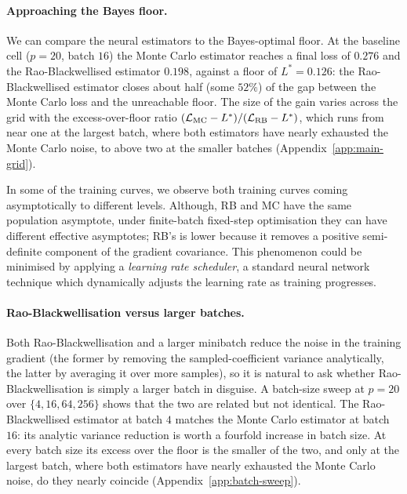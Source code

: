 \paragraph{Approaching the Bayes floor.}
\label{sec:lr-asymptotic}
We can compare the neural estimators to the Bayes-optimal floor. At the
baseline cell ($p = 20$, batch $16$) the Monte Carlo estimator reaches
a final loss of $0.276$ and the Rao-Blackwellised estimator $0.198$,
against a floor of $L^{*} = 0.126$: the Rao-Blackwellised estimator
closes about half (some $52\%$) of the gap between the Monte Carlo
loss and the unreachable floor. The size of the gain varies across the
grid with the excess-over-floor ratio
$(\mathcal{L}_{\mathrm{MC}} - L^{*})/(\mathcal{L}_{\mathrm{RB}} - L^{*})$, which runs
from near one at the largest batch, where both estimators have nearly
exhausted the Monte Carlo noise, to above two at the smaller batches
(Appendix~\ref{app:main-grid}).

In some of the training curves, we observe both training curves coming asymptotically to different levels. Although, RB and MC have the same population asymptote, under finite-batch fixed-step optimisation they can have different effective asymptotes; RB's is lower because it removes a positive semi-definite component of the gradient covariance. This phenomenon could be minimised by applying a \emph{learning rate scheduler}, a standard neural network technique which dynamically adjusts the learning rate as training progresses.

\paragraph{Rao-Blackwellisation versus larger batches.}
\label{sec:lr-batch}
Both Rao-Blackwellisation and a larger minibatch reduce the noise in
the training gradient (the former by removing the sampled-coefficient
variance analytically, the latter by averaging it over more samples),
so it is natural to ask whether Rao-Blackwellisation is simply a larger
batch in disguise. A batch-size sweep at $p = 20$ over
$\{4, 16, 64, 256\}$ shows that the two are related but not identical.
The Rao-Blackwellised estimator at batch $4$ matches the Monte Carlo
estimator at batch $16$: its analytic variance reduction is worth a
fourfold increase in batch size. At every batch size its excess over
the floor is the smaller of the two, and only at the largest batch,
where both estimators have nearly exhausted the Monte Carlo noise, do
they nearly coincide (Appendix~\ref{app:batch-sweep}).


